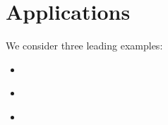 \section{Applications}
We consider three leading examples:
\begin{itemize}
	\item \cite{abadie:2003}
	\item \cite{abadie:2010}
	\item \cite{abadie:2015}
\end{itemize}